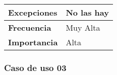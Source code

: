 \begin{tabularx}{\columnwidth}{l|l}
\begin{minipage}{0.25\columnwidth}
\textbf{Excepciones} 
\end{minipage}
&
\begin{minipage}{0.65\columnwidth}
No las hay
\end{minipage}
\\ \hline

\begin{minipage}{0.25\columnwidth}
\textbf{Frecuencia} 
\end{minipage}
&
\begin{minipage}{0.65\columnwidth}
Muy Alta
\end{minipage}
\\ \hline

\begin{minipage}{0.25\columnwidth}
\textbf{Importancia} 
\end{minipage}
&
\begin{minipage}{0.65\columnwidth}
Alta
\end{minipage}
\\ \hline
\end{tabularx}

\subsubsection{Caso de uso 03}

